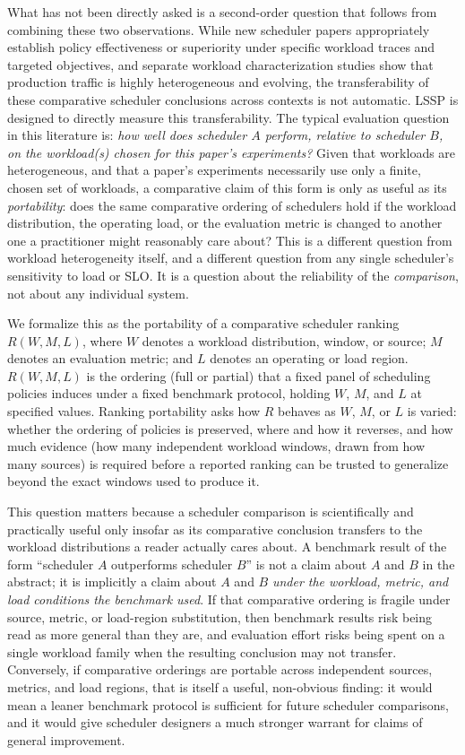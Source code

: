 \documentclass[sn-basic,Numbered,pdflatex]{sn-jnl}
\begin{document}
What has not been directly asked is a second-order question that follows
from combining these two observations. While new scheduler papers
appropriately establish policy effectiveness or superiority under specific
workload traces and targeted objectives, and separate workload characterization
studies show that production traffic is highly heterogeneous and evolving,
the transferability of these comparative scheduler conclusions across contexts is
not automatic. LSSP is designed to directly measure this transferability.
The typical evaluation question in
this literature is: \emph{how well does scheduler $A$ perform, relative to
scheduler $B$, on the workload(s) chosen for this paper's experiments?} Given
that workloads are heterogeneous, and that a paper's experiments necessarily
use only a finite, chosen set of workloads, a comparative claim of this form
is only as useful as its \emph{portability}: does the same comparative
ordering of schedulers hold if the workload distribution, the operating
load, or the evaluation metric is changed to another one a practitioner
might reasonably care about? This is a different question from workload
heterogeneity itself, and a different question from any single scheduler's
sensitivity to load or SLO. It is a question about the reliability of the
\emph{comparison}, not about any individual system.

We formalize this as the portability of a comparative scheduler ranking
$R(W, M, L)$, where $W$ denotes a workload distribution, window, or source;
$M$ denotes an evaluation metric; and $L$ denotes an operating or load
region. $R(W, M, L)$ is the ordering (full or partial) that a fixed panel of
scheduling policies induces under a fixed benchmark protocol, holding $W$,
$M$, and $L$ at specified values. Ranking portability asks how $R$ behaves as
$W$, $M$, or $L$ is varied: whether the ordering of policies is preserved,
where and how it reverses, and how much evidence (how many independent
workload windows, drawn from how many sources) is required before a
reported ranking can be trusted to generalize beyond the exact windows used
to produce it.

This question matters because a scheduler comparison is scientifically and
practically useful only insofar as its comparative conclusion transfers to
the workload distributions a reader actually cares about. A benchmark result
of the form ``scheduler $A$ outperforms scheduler $B$'' is not a claim about
$A$ and $B$ in the abstract; it is implicitly a claim about $A$ and $B$
\emph{under the workload, metric, and load conditions the benchmark used}.
If that comparative ordering is fragile under source, metric, or
load-region substitution, then benchmark results risk being read as more
general than they are, and evaluation effort risks being spent on a single
workload family when the resulting conclusion may not transfer. Conversely,
if comparative orderings are portable across independent sources, metrics,
and load regions, that is itself a useful, non-obvious finding: it would
mean a leaner benchmark protocol is sufficient for future scheduler
comparisons, and it would give scheduler designers a much stronger warrant
for claims of general improvement.
\end{document}
